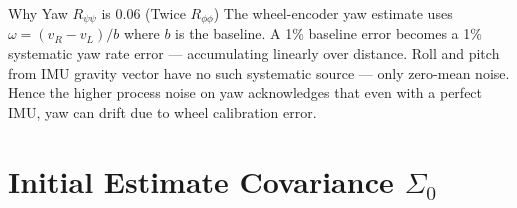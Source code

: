\documentclass[11pt,a4paper]{article}
\begin{document}
\begin{intuitionbox}{Why Yaw $R_{\psi\psi}$ is 0.06 (Twice $R_{\phi\phi}$)}
The wheel-encoder yaw estimate uses $\omega = (v_R - v_L) / b$ where $b$ is the baseline. A 1\% baseline error becomes a 1\% systematic yaw rate error --- accumulating linearly over distance. Roll and pitch from IMU gravity vector have no such systematic source --- only zero-mean noise. Hence the higher process noise on yaw acknowledges that even with a perfect IMU, yaw can drift due to wheel calibration error.
\end{intuitionbox}

\section{Initial Estimate Covariance $\Sigma_0$}
\end{document}
